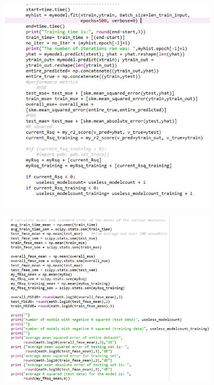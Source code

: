 \documentclass[]{article}
\begin{document}
\begin{figure}
\centering
\includegraphics[width=1\textwidth,height=\textheight]{images/mlp4.jpg}
\end{figure}

\begin{figure}
\centering
\includegraphics[width=1\textwidth,height=\textheight]{images/mlp5.jpg}
\end{figure}
\end{document}
